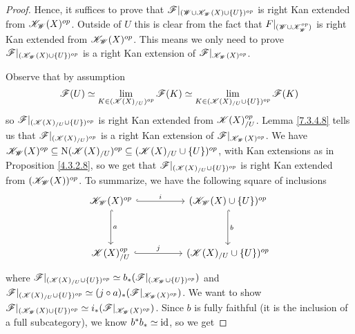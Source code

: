 \documentclass[../../thesis.tex]{subfiles}
\begin{document}
\begin{proof}
    Hence, it suffices to prove that $\mathscr{F}|_{(\mathscr{W} \cup \mathscr{K}_{\mathscr{W}}(X)\cup \{U\})^{op}}$ is right Kan extended from $\mathscr{K}_{\mathscr{W}}(X)^{op}$.
    Outside of $U$ this is clear from the fact that $F|_{(\mathscr{W} \cup \mathscr{K}_{\mathscr{W}}^{op})}$ is right Kan extended from $\mathscr{K}_{\mathscr{W}}(X)^{op}$.
    This means we only need to prove $\mathscr{F}|_{(\mathscr{K}_{\mathscr{W}}(X)\cup \{U\})^{op}}$ is a right Kan extension of $\mathscr{F}|_{\mathscr{K}_{\mathscr{W}}(X)^{op}}$.

    Observe that by assumption
    \[
        \mathscr{F}(U)  \simeq \lim_{K\in (\mathscr{K}(X)_{/U})^{op}} \mathscr{F}(K) \simeq \lim_{K\in (\mathscr{K}(X)_{/U} \cup \{U\})^{op}} \mathscr{F}(K)
    \]
    so $\mathscr{F}|_{(\mathscr{K}(X)_{/U} \cup \{U\})^{op}}$ is right Kan extended from $\mathscr{K}(X)_{/U}^{op}$.
    Lemma \ref{7.3.4.8} tells us that $\mathscr{F}|_{(\mathscr{K}(X)_{/U})^{op}}$ is a right Kan extension of $\mathscr{F}|_{\mathscr{K}_{\mathscr{W}}(X)^{op}}$.
    We have ${\mathscr{K}_{\mathscr{W}}(X)^{op} \subseteq\mathrm{N}(\mathscr{K}(X)_{/U})^{op} \subseteq (\mathscr{K}(X)_{/U} \cup \{U\})^{op}}$, with Kan extensions as in Proposition \ref{4.3.2.8}, so we get that ${\mathscr{F}|_{(\mathscr{K}(X)_{/U} \cup \{U\})^{op}}}$ is right Kan extended from ${(\mathscr{K}_{\mathscr{W}}(X))^{op}}$.
    To summarize, we have the following square of inclusions
    \[\begin{tikzcd}
            {\K_{\W}(X)^{op}} && {(\K_{\W}(X)\cup \{U\})^{op}} \\
            \\
            {\K(X)_{/U}^{op}} && {(\K(X)_{/U} \cup \{U\})^{op}}
            \arrow["{b}", hook, from=1-3, to=3-3]
            \arrow["{j}", hook, from=3-1, to=3-3]
            \arrow["{a}", hook, from=1-1, to=3-1]
            \arrow["{i}" ,hook, from=1-1, to=1-3]
        \end{tikzcd}\]
    where $\mathscr{F}|_{(\mathscr{K}(X)_{/U} \cup \{ U \})^{op}} \simeq b_*(\mathscr{F}|_{(\mathscr{K}_{\mathscr{W}} \cup \{U\})^{op}})$ and $\mathscr{F}|_{(\mathscr{K}(X)_{/U} \cup \{U\})^{op}} \simeq (j\circ a)_*(\mathscr{F}|_{\mathscr{K}_{\mathscr{W}}(X)^{op}})$.
    We want to show $\mathscr{F}|_{(\mathscr{K}_{\mathscr{W}}(X) \cup \{U\})^{op}} \simeq i_*(\mathscr{F}|_{\mathscr{K}_{\mathscr{W}}(X)^{op}})$.
    Since $b$ is fully faithful (it is the inclusion of a full subcategory), we know $b^*b_* \simeq \operatorname{id}$, so we get

\end{proof}
\end{document}
